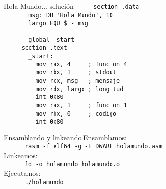 \documentclass[aspectratio=169]{beamer}
\begin{document}
\begin{frame}[fragile]{Hola Mundo... solución}
    \verb|     section .data                  |\\ 
    \verb|       msg: DB 'Hola Mundo', 10     | \A \A \B \B \B \B \B \B \B \B \B \B \T \\
    \verb|       largo EQU $ - msg            |\\
    \verb|                                    |\\
    \verb|       global _start                |\\
    \verb|     section .text                  |\\
    \verb|       _start:                      |\\
    \verb|         mov rax, 4     ; funcion 4 | \A \A  \R \R \B \B \B \B \B \B \B \B \\
    \verb|         mov rbx, 1     ; stdout    | \A \A  \R \R \B \B \B \B \B \B \B \B \\
    \verb|         mov rcx, msg   ; mensaje   | \A \A  \R \R \B \B \B \B \B \B \B \B \\
    \verb|         mov rdx, largo ; longitud  | \A \A  \R \R \B \B \B \B \B \B \B \B \\
    \verb|         int 0x80                   | \A \A  \R \B \\
    \verb|         mov rax, 1     ; funcion 1 | \A \A  \R \R \B \B \B \B \B \B \B \B \\
    \verb|         mov rbx, 0     ; codigo    | \A \A  \R \R \B \B \B \B \B \B \B \B \\
    \verb|         int 0x80                   | \A \A  \R \B \\
\end{frame}

\begin{frame}[fragile]{Ensamblando y linkeando}
    Ensamblamos:\\
    \vspace{0.2cm}
    \verb|      nasm -f elf64 -g -F DWARF holamundo.asm|\\
    \vspace{1cm}
    Linkeamos:\\
    \vspace{0.2cm}
    \verb|      ld -o holamundo holamundo.o|\\
    \vspace{1cm}
    Ejecutamos:\\
    \vspace{0.2cm}
    \verb|      ./holamundo|\\
\end{frame}
\end{document}
